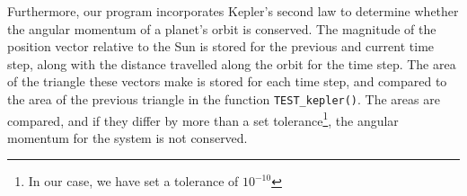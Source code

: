 	Furthermore, our program incorporates Kepler's second law to determine whether the angular momentum of a planet's orbit is conserved. The magnitude of the position vector relative to the Sun is stored for the previous and current time step, along with the distance travelled along the orbit for the time step. The area of the triangle these vectors make is stored for each time step, and compared to the area of the previous triangle in the function \texttt{TEST\_kepler()}. The areas are compared, and if they differ by more than a set tolerance\footnote{In our case, we have set a tolerance of $10^{-10}$}, the angular momentum for the system is not conserved.